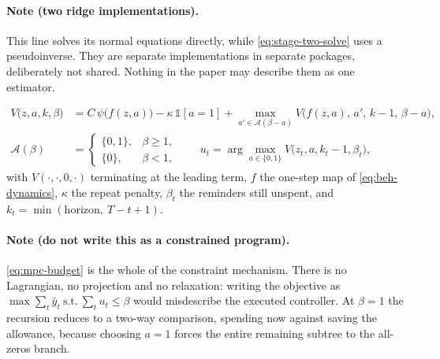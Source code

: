 \paragraph{Note (two ridge implementations).}
This line solves its normal equations directly, while \eqref{eq:stage-two-solve} uses a
pseudoinverse. They are separate implementations in separate packages, deliberately not
shared. Nothing in the paper may describe them as one estimator.

\begin{align}
  V\bigl(z, a, k, \beta\bigr)
    &= C\,\psi\bigl(f(z,a)\bigr) - \kappa\,\mathbb{1}[a = 1]
     + \max_{a' \in \mathcal{A}(\beta - a)} V\bigl(f(z,a),\, a',\, k-1,\, \beta - a\bigr),
  \label{eq:mpc-value}\\[4pt]
  \mathcal{A}(\beta) &=
  \begin{cases}
    \{0, 1\}, & \beta \ge 1,\\
    \{0\}, & \beta < 1,
  \end{cases}
  \qquad
  u_t = \arg\max_{a \in \{0,1\}} V\bigl(z_t, a, k_t - 1, \beta_t\bigr),
  \label{eq:mpc-budget}
\end{align}
%
\noindent with $V(\cdot,\cdot,0,\cdot)$ terminating at the leading term, $f$ the one-step map
of \eqref{eq:beh-dynamics}, $\kappa$ the repeat penalty, $\beta_t$ the reminders still
unspent, and $k_t = \min(\text{horizon},\ T - t + 1)$.

\paragraph{Note (do not write this as a constrained program).}
\eqref{eq:mpc-budget} is the whole of the constraint mechanism. There is no Lagrangian, no
projection and no relaxation: writing the objective as
$\max \sum_t \hat y_t \ \text{s.t.}\ \sum_t u_t \le \beta$ would misdescribe the executed
controller. At $\beta = 1$ the recursion reduces to a two-way comparison, spending now
against saving the allowance, because choosing $a=1$ forces the entire remaining subtree to
the all-zeros branch.

